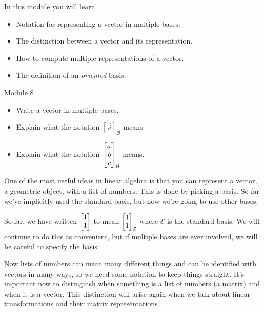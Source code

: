 \begin{module}

	In this module you will learn
	\begin{itemize}
		\item Notation for representing a vector in multiple bases.
		\item The distinction between a vector and its representation.
		\item How to compute multiple representations of a vector.
		\item The definition of an \emph{oriented} basis.
	\end{itemize}

	
	
\end{module}
\begin{lesson}

	Module 8

	\begin{itemize}
		\item Write a vector in multiple bases.
		\item Explain what the notation $[\vec v]_{\mathcal B}$ means.
		\item Explain what the notation $\mat{a\\b\\c}_{\mathcal B}$ means.
	\end{itemize}

	One of the most useful ideas in linear algebra is that you can
	represent a vector, a geometric object, with a list of numbers. This
	is done by picking a basis. So far we've implicitly used the standard basis,
	but now we're going to use other bases.

	\begin{annotation}
		\begin{notes}
			So far, we have written $\mat{1\\1}$ to mean
			$\mat{1\\1}_{\mathcal E}$ where $\mathcal E$ is the
			standard basis. We will continue to do this as convenient,
			but if multiple bases are ever involved, we will be careful
			to specify the basis.
		\end{notes}
	\end{annotation}
	Now lists of numbers can mean many different things and can be identified
	with vectors in many ways, so we need some notation to keep things straight.
	It's important now to distinguish when something is a list of numbers (a matrix)
	and when it is a vector. This distinction will arise again when
	we talk about linear transformations and their matrix representations.

\end{lesson}
	\bookonlynewpage
